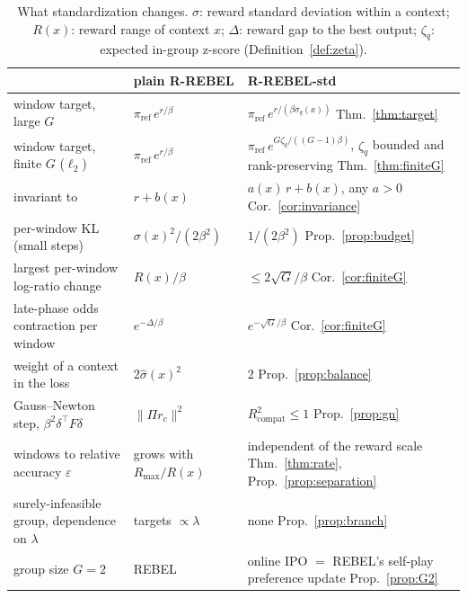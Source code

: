 \documentclass[11pt]{article}
\theoremstyle{definition}
\theoremstyle{remark}
\newcommand{\pref}{\pi_{\mathrm{ref}}}
\newcommand{\1}{\mathbb{1}}
\newcommand{\rr}{R-REBEL}
\newcommand{\rrs}{R-REBEL-std}
\begin{document}
\begin{table}[H]
\centering\footnotesize
\renewcommand{\arraystretch}{1.15}
\begin{tabularx}{\textwidth}{@{}>{\raggedright\arraybackslash}p{4.3cm}>{\raggedright\arraybackslash}p{3.1cm}X@{}}
\toprule
 & plain \rr{} & \rrs{} \\
\midrule
window target, large $G$ & $\pref\, e^{r/\beta}$ & $\pref\, e^{r/(\beta\sigma_q(x))}$ \hfill Thm.~\ref{thm:target}\\
window target, finite $G$ ($\ell_2$) & $\pref\, e^{r/\beta}$ & $\pref\, e^{G\zeta_q/((G-1)\beta)}$, $\zeta_q$ bounded and rank-preserving \hfill Thm.~\ref{thm:finiteG}\\
invariant to & $r+b(x)$ & $a(x)\,r+b(x)$, any $a>0$ \hfill Cor.~\ref{cor:invariance}\\
per-window KL (small steps) & $\sigma(x)^2/(2\beta^2)$ & $1/(2\beta^2)$ \hfill Prop.~\ref{prop:budget}\\
largest per-window log-ratio change & $R(x)/\beta$ & $\le 2\sqrt{G}/\beta$ \hfill Cor.~\ref{cor:finiteG}\\
late-phase odds contraction per window & $e^{-\Delta/\beta}$ & $e^{-\sqrt{G}/\beta}$ \hfill Cor.~\ref{cor:finiteG}\\
weight of a context in the loss & $2\hat\sigma(x)^2$ & $2$ \hfill Prop.~\ref{prop:balance}\\
Gauss--Newton step, $\beta^2\delta^\top F\delta$ & $\|\Pi r_c\|^2$ & $R^2_{\mathrm{compat}}\le 1$ \hfill Prop.~\ref{prop:gn}\\
windows to relative accuracy $\varepsilon$ & grows with $R_{\max}/R(x)$ & independent of the reward scale \hfill Thm.~\ref{thm:rate}, Prop.~\ref{prop:separation}\\
surely-infeasible group, dependence on $\lambda$ & targets $\propto\lambda$ & none \hfill Prop.~\ref{prop:branch}\\
group size $G=2$ & REBEL & online IPO $=$ REBEL's self-play preference update \hfill Prop.~\ref{prop:G2}\\
\bottomrule
\end{tabularx}
\caption{What standardization changes. $\sigma$: reward standard deviation within a
context; $R(x)$: reward range of context $x$; $\Delta$: reward gap to the best
output; $\zeta_q$: expected in-group z-score (Definition~\ref{def:zeta}).}
\label{tab:summary}
\end{table}

\tableofcontents

\end{document}

